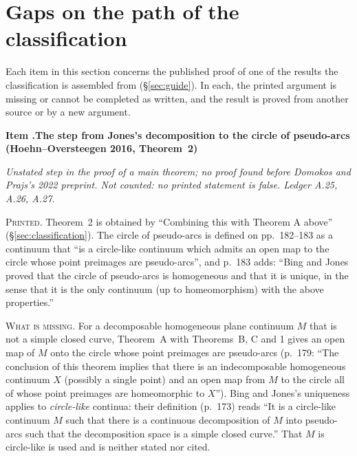 \documentclass[11pt]{article}
\newcounter{defect}
\newenvironment{defect}[4]{%
  \par\addvspace{10pt}\refstepcounter{defect}%
  \noindent\textbf{Item \thedefect.\enspace #1}\par\nopagebreak
  \noindent\textit{#2}\par\nopagebreak\smallskip}{\par\addvspace{6pt}}
\newcommand{\fld}[1]{\par\noindent\textsc{#1.}\enspace}
\begin{document}
\section{Gaps on the path of the classification}\label{sec:path}

Each item in this section concerns the published proof of one of the results the classification
is assembled from (\S\ref{sec:guide}). In each, the printed argument is missing or cannot be
completed as written, and the result is proved from another source or by a new argument.

\begin{defect}{The step from Jones's decomposition to the circle of pseudo-arcs (Hoehn--Oversteegen
2016, Theorem~2)}{Unstated step in the proof of a main theorem; no proof found before
Domokos and Prajs's 2022 preprint. Not counted: no printed statement is false. Ledger A.25, A.26,
A.27.}{0}{0}\label{it:unique}

\fld{Printed} Theorem~2 is obtained by ``Combining this with Theorem A above'' (\S\ref{sec:classification}).
The circle of pseudo-arcs is defined on pp.~182--183 as a continuum that ``is a circle-like
continuum which admits an open map to the circle whose point preimages are pseudo-arcs'', and
p.~183 adds: ``Bing and Jones proved that the circle of pseudo-arcs is homogeneous and that it is
unique, in the sense that it is the only continuum (up to homeomorphism) with the above
properties.''

\fld{What is missing} For a decomposable homogeneous plane continuum $M$ that is not a simple
closed curve, Theorem~A with Theorems~B, C and 1 gives an open map of $M$ onto the circle whose
point preimages are pseudo-arcs
(p.~179: ``The conclusion of this theorem implies that there is an indecomposable homogeneous
continuum $X$ (possibly a single point) and an open map from $M$ to the circle all of whose point
preimages are homeomorphic to $X$''). Bing and Jones's uniqueness applies to \emph{circle-like}
continua: their definition (p.~173) reads ``It is a circle-like continuum $M$ such that there is a
continuous decomposition of $M$ into pseudo-arcs such that the decomposition space is a simple
closed curve.'' That $M$ is circle-like is used and is neither stated nor cited.


\end{defect}
\end{document}
